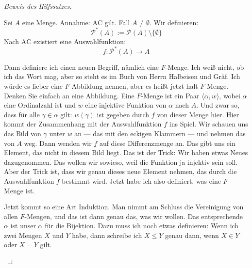 \begin{proof}[Beweis des Hilfssatzes]
\begin{math-stroke}
Sei $A$ eine Menge. Annahme: $\text{AC}$ gilt.
Fall $A \neq \emptyset$.
Wir definieren:
\[
\mathcal{P}^*(A) := \mathcal{P}(A) \setminus \{\emptyset\}
\]
Nach $\text{AC}$ existiert eine Auswahlfunktion:
\[
f: \mathcal{P}^*(A) \to A
\]
\end{math-stroke}

\begin{spoken-clean}[00:45:14 - 00:46:55]
Dann definiere ich einen neuen Begriff, nämlich eine $F$-Menge. Ich weiß nicht, ob ich das Wort mag, aber so steht es im Buch von Herrn Halbeisen und Gräf. Ich würde es lieber eine $F$-Abbildung nennen, aber es heißt jetzt halt $F$-Menge. Denken Sie einfach an eine Abbildung. Eine $F$-Menge ist ein Paar $\langle \alpha, w \rangle$, wobei $\alpha$ eine Ordinalzahl ist und $w$ eine injektive Funktion von $\alpha$ nach $A$. Und zwar so, dass für alle $\gamma \in \alpha$ gilt: $w(\gamma)$ ist gegeben durch $f$ von dieser Menge hier. Hier kommt der Zusammenhang mit der Auswahlfunktion $f$ ins Spiel. Wir schauen uns das Bild von $\gamma$ unter $w$ an --- das mit den eckigen Klammern --- und nehmen das von $A$ weg. Dann wenden wir $f$ auf diese Differenzmenge an. Das gibt uns ein Element, das nicht in diesem Bild liegt. Das ist der Trick: Wir haben etwas Neues dazugenommen. Das wollen wir sowieso, weil die Funktion ja injektiv sein soll. Aber der Trick ist, dass wir genau dieses neue Element nehmen, das durch die Auswahlfunktion $f$ bestimmt wird. Jetzt habe ich also definiert, was eine $F$-Menge ist.
\end{spoken-clean}

\begin{math-stroke}
\end{math-stroke}

\begin{spoken-clean}[00:46:55 - 00:48:30]
Jetzt kommt so eine Art Induktion. Man nimmt am Schluss die Vereinigung von allen $F$-Mengen, und das ist dann genau das, was wir wollen. Das entsprechende $\alpha$ ist unser $\alpha$ für die Bijektion. Dazu muss ich noch etwas definieren: Wenn ich zwei Mengen $X$ und $Y$ habe, dann schreibe ich $X \le Y$ genau dann, wenn $X \in Y$ oder $X = Y$ gilt.


\end{spoken-clean}
\end{proof}

